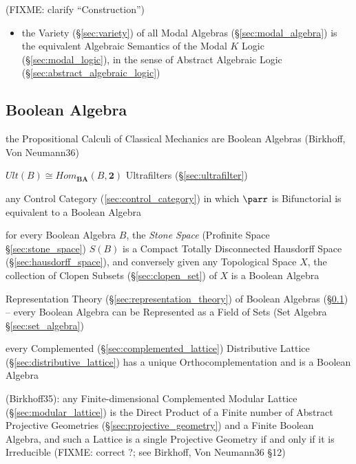 (FIXME: clarify ``Construction'')

\begin{itemize}
\item the Variety (\S\ref{sec:variety}) of all Modal Algebras
  (\S\ref{sec:modal_algebra}) is the equivalent Algebraic Semantics of the Modal
  $K$ Logic (\S\ref{sec:modal_logic}), in the sense of Abstract Algebraic Logic
  (\S\ref{sec:abstract_algebraic_logic})
\end{itemize}


\subsection{Boolean Algebra}\label{sec:boolean_algebra}

the Propositional Calculi of Classical Mechanics are Boolean Algebras (Birkhoff,
Von Neumann36)

$Ult(B) \cong Hom_\mathbf{BA}(B,\mathbf{2})$ Ultrafilters
(\S\ref{sec:ultrafilter})

any Control Category (\ref{sec:control_category}) in which $\parr$ is
Bifunctorial is equivalent to a Boolean Algebra \cite{selinger01}

for every Boolean Algebra $B$, the \emph{Stone Space} (Profinite Space
\S\ref{sec:stone_space}) $\xspace{S}(B)$ is a Compact Totally Disconnected
Hausdorff Space (\S\ref{sec:hausdorff_space}), and conversely given any
Topological Space $X$, the collection of Clopen Subsets (\S\ref{sec:clopen_set})
of $X$ is a Boolean Algebra

Representation Theory (\S\ref{sec:representation_theory}) of Boolean Algebras
(\S\ref{sec:boolean_algebra}) -- every Boolean Algebra can be Represented as a
Field of Sets (Set Algebra \S\ref{sec:set_algebra})

every Complemented (\S\ref{sec:complemented_lattice}) Distributive Lattice
(\S\ref{sec:distributive_lattice}) has a unique Orthocomplementation and is a
Boolean Algebra

(Birkhoff35): any Finite-dimensional Complemented Modular Lattice
(\S\ref{sec:modular_lattice}) is the Direct Product of a Finite number of
Abstract Projective Geometries (\S\ref{sec:projective_geometry}) and a Finite
Boolean Algebra, and such a
Lattice is a single Projective Geometry if and only if it is Irreducible
(FIXME: correct ?; see Birkhoff, Von Neumann36 \S 12)


